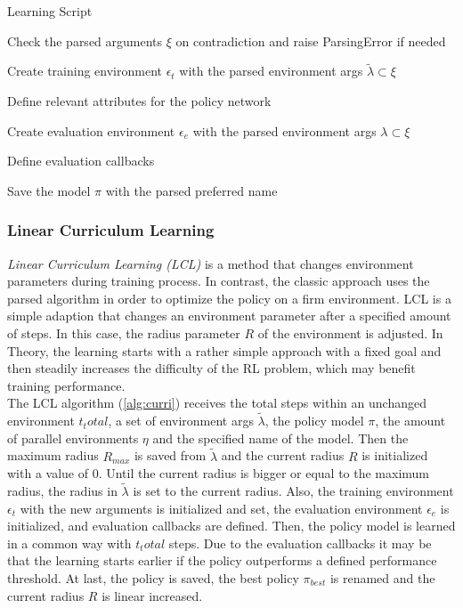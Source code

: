 \begin{algorithm}
	\caption{Learning Script}
	\label{alg:learn}
	
	Check the parsed arguments $\xi$ on contradiction and raise ParsingError if needed
	
	Create training environment $\epsilon_t$ with the parsed environment args $\tilde{\lambda} \subset \xi$
	
	Define relevant attributes for the policy network
	
	
	Create evaluation environment $\epsilon_e$ with the parsed environment args $\lambda \subset \xi$
	
	Define evaluation callbacks
	
	
	Save the model $\pi$ with the parsed preferred name
	
	
\end{algorithm}

\subsubsection{Linear Curriculum Learning}
\emph{Linear Curriculum Learning (LCL)} is a method that changes environment parameters during training process. 
In contrast, the classic approach uses the parsed algorithm in order to optimize the policy on a firm environment. 
LCL is a simple adaption that changes an environment parameter after a specified amount of steps. 
In this case, the radius parameter $R$ of the environment is adjusted. 
In Theory, the learning starts with a rather simple approach with a fixed goal and then steadily increases the difficulty of the RL problem, 
which may benefit training performance.\\
The LCL algorithm (\cref{alg:curri}) receives the total steps within an unchanged environment $t_total$, a set of environment args $\tilde{\lambda}$, 
the policy model $\pi$, the amount of parallel environments $\eta$ and the specified name of the model.
Then the maximum radius $R_{max}$ is saved from $\tilde{\lambda}$ and the current radius $R$ is initialized with a value of $0$.
Until the current radius is bigger or equal to the maximum radius, 
the radius in $\tilde{\lambda}$ is set to the current radius. 
Also, the training environment $\epsilon_t$ with the new arguments is initialized and set, 
the evaluation environment $\epsilon_e$ is initialized, and evaluation callbacks are defined. 
Then, the policy model is learned in a common way with $t_total$ steps. 
Due to the evaluation callbacks it may be that the learning starts earlier if the policy outperforms a defined performance threshold. 
At last, the policy is saved, the best policy $\pi_{best}$ is renamed and the current radius $R$ is linear increased.

